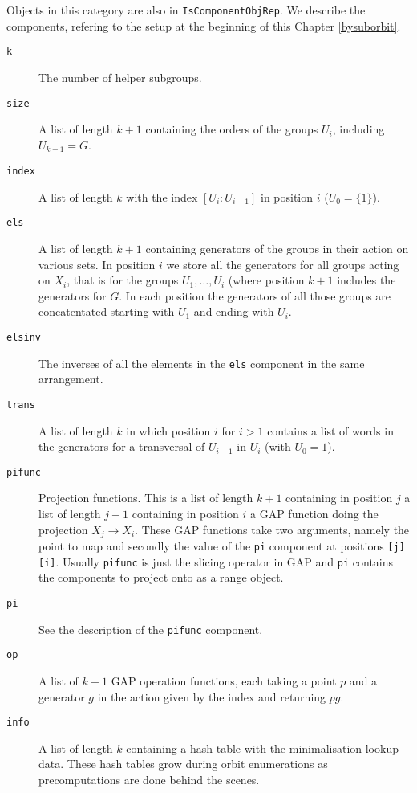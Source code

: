 \documentclass[a4paper,11pt]{report}
\begin{document}
{{{ Objects in this category are also in \texttt{IsComponentObjRep}. We describe the components, refering to the setup at the beginning of this
Chapter \ref{bysuborbit}. 
\begin{description}
\item[{\texttt{k}}]  The number of helper subgroups. 
\item[{\texttt{size}}]  A list of length $k+1$ containing the orders of the groups $U_i$, including $U_{{k+1}} = G$. 
\item[{\texttt{index}}]  A list of length $k$ with the index $[U_i:U_{{i-1}}]$ in position $i$ ($U_0 = \{1\}$). 
\item[{\texttt{els}}]  A list of length $k+1$ containing generators of the groups in their action on various sets. In
position $i$ we store all the generators for all groups acting on $X_i$, that is for the groups $U_1, \ldots, U_i$ (where position $k+1$ includes the generators for $G$. In each position the generators of all those groups are concatentated
starting with $U_1$ and ending with $U_i$. 
\item[{\texttt{elsinv}}]  The inverses of all the elements in the \texttt{els} component in the same arrangement. 
\item[{\texttt{trans}}]  A list of length $k$ in which position $i$ for $i>1$ contains a list of words in the generators for a transversal of $U_{{i-1}}$ in $U_i$ (with $U_0 = 1$). 
\item[{\texttt{pifunc}}]  Projection functions. This is a list of length $k+1$ containing in position $j$ a list of length $j-1$ containing in position $i$ a \textsf{GAP} function doing the projection $X_j \to X_i$. These \textsf{GAP} functions take two arguments, namely the point to map and secondly the value
of the \texttt{pi} component at positions \texttt{[j][i]}. Usually \texttt{pifunc} is just the slicing operator in \textsf{GAP} and \texttt{pi} contains the components to project onto as a range object. 
\item[{\texttt{pi}}]  See the description of the \texttt{pifunc} component. 
\item[{\texttt{op}}]  A list of $k+1$ \textsf{GAP} operation functions, each taking a point $p$ and a generator $g$ in the action given by the index and returning $pg$. 
\item[{\texttt{info}}]  A list of length $k$ containing a hash table with the minimalisation lookup data. These hash tables
grow during orbit enumerations as precomputations are done behind the scenes. 


\end{description}}}}
\end{document}

